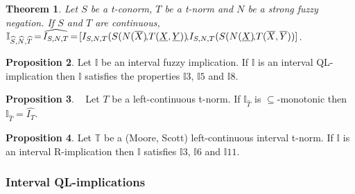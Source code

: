 \documentclass[12pt]{article}
\theoremstyle{plain}
\newtheorem{theorem}{Theorem}[section]
\theoremstyle{remark}
\theoremstyle{definition}
\theoremstyle{proposition}
\newtheorem{proposition}[theorem]{Proposition}
\newcommand{\II}{\mathbb{I} }
\begin{document}
\begin{theorem}\cite[Theorema 4]{Rei07}\label{teo-QL-imp-BIR}
Let $S$ be a t-conorm, $T$ be a t-norm and $N$ be a strong fuzzy
negation. If $S$ and $T$  are continuous,
$\II_{\widehat{S},\widehat{N},\widehat{T}}\hspace{-0.05cm}=
\hspace{-0.05cm}\widehat{I_{S,N,T}}\hspace{-0.05cm}=\hspace{-0.05cm} [I_{S,N,T}(S(N(\overline{X})\hspace{-0.05cm},\hspace{-0.05cm}T(\underline{X},\underline{Y}))\hspace{-0.05cm},\hspace{-0.05cm} I_{S,N,T}(S(N(\underline{X})\hspace{-0.05cm},\hspace{-0.05cm}T(\overline{X},\overline{Y}))]$.
\end{theorem}

\begin{proposition}\label{pro-int-QLimp-prop}
Let $\II$ be an interval fuzzy implication. If $\II$ is an
interval QL-implication then $\II$ satisfies the properties $\II3$, $\II5$ and $\II8$.
\end{proposition}


\begin{proposition}~\cite[Theorem 24]{BDR09}
Let $T$ be a left-continuous t-norm. If $\II_{\widehat{T}}$ is $\subseteq$-monotonic then
$\II_{\widehat{T}}=\widehat{I_{T}}$.
\end{proposition}

\begin{proposition}\cite[Theorem 14]{BDR09}\label{pn}
Let $\mathbb{T}$ be a (Moore, Scott) left-continuous interval t-norm. If $\II$ is an
interval R-implication then $\II$ satisfies $\II3$, $\II6$ and $\II11$.
\end{proposition}

\subsubsection{Interval QL-implications}\label{subclass-int-ql}

\end{document}
